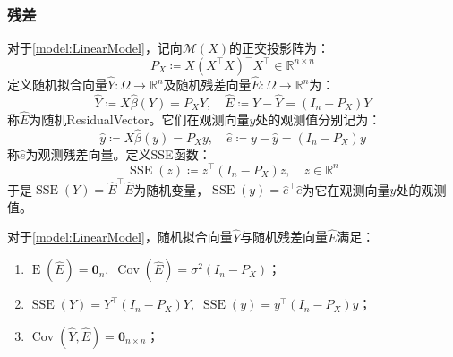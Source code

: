 \subsubsection{残差}
\begin{definition}
	对于\cref{model:LinearModel}，记向$\mathcal{M}(X)$的正交投影阵为：
	\begin{equation*}
		P_X\coloneq X(X^{\top}X)^-X^{\top}\in\mathbb{R}^{n\times n}
	\end{equation*}
	定义随机拟合向量$\widehat{Y}:\Omega\to\mathbb{R}^n$及随机残差向量$\widehat{E}:\Omega\to\mathbb{R}^n$为：
	\begin{equation*}
		\widehat{Y}\coloneq X\hat{\beta}(Y)=P_XY,\quad
		\widehat{E}\coloneq Y-\widehat{Y}=(I_n-P_X)Y
	\end{equation*}
	称$\widehat{E}$为随机\gls{ResidualVector}。它们在观测向量$y$处的观测值分别记为：
	\begin{equation*}
		\hat{y}\coloneq X\hat{\beta}(y)=P_Xy,\quad
		\hat{e}\coloneq y-\hat{y}=(I_n-P_X)y
	\end{equation*}
	称$\hat{e}$为观测残差向量。定义\gls{SSE}函数：
	\begin{equation*}
		\operatorname{SSE}(z)\coloneq z^{\top}(I_n-P_X)z,\quad z\in\mathbb{R}^n
	\end{equation*}
	于是$\operatorname{SSE}(Y)=\widehat{E}^{\top}\widehat{E}$为随机变量，$\operatorname{SSE}(y)=\hat{e}^{\top}\hat{e}$为它在观测向量$y$处的观测值。
\end{definition}
\begin{property}\label{prop:ehat}
	对于\cref{model:LinearModel}，随机拟合向量$\widehat{Y}$与随机残差向量$\widehat{E}$满足：
	\begin{enumerate}
		\item $\operatorname{E}(\widehat{E})=\mathbf{0}_n,\;\operatorname{Cov}(\widehat{E})=\sigma^2(I_n-P_X)$；
		\item $\operatorname{SSE}(Y)=Y^{\top}(I_n-P_X)Y,\;\operatorname{SSE}(y)=y^{\top}(I_n-P_X)y$；
		\item $\operatorname{Cov}(\widehat{Y},\widehat{E})=\mathbf{0}_{n\times n}$；
	\end{enumerate}
\end{property}

